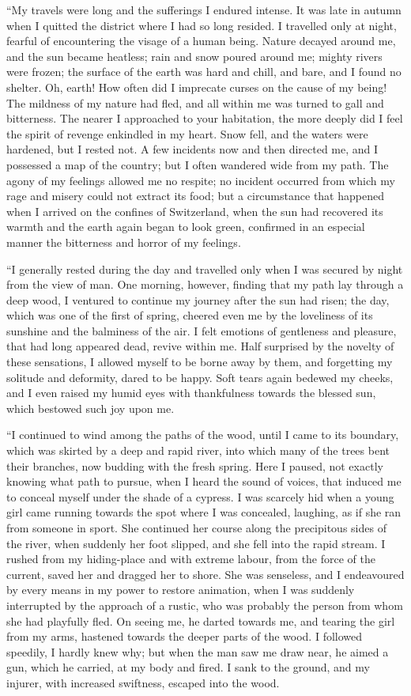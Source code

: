 \documentclass[12pt,openright]{book}
\begin{document}
“My travels were long and the sufferings I endured intense. It was late in autumn when I quitted the district where I had so long resided. I travelled only at night, fearful of encountering the visage of a human being. Nature decayed around me, and the sun became heatless; rain and snow poured around me; mighty rivers were frozen; the surface of the earth was hard and chill, and bare, and I found no shelter. Oh, earth! How often did I imprecate curses on the cause of my being! The mildness of my nature had fled, and all within me was turned to gall and bitterness. The nearer I approached to your habitation, the more deeply did I feel the spirit of revenge enkindled in my heart. Snow fell, and the waters were hardened, but I rested not. A few incidents now and then directed me, and I possessed a map of the country; but I often wandered wide from my path. The agony of my feelings allowed me no respite; no incident occurred from which my rage and misery could not extract its food; but a circumstance that happened when I arrived on the confines of Switzerland, when the sun had recovered its warmth and the earth again began to look green, confirmed in an especial manner the bitterness and horror of my feelings.

“I generally rested during the day and travelled only when I was secured by night from the view of man. One morning, however, finding that my path lay through a deep wood, I ventured to continue my journey after the sun had risen; the day, which was one of the first of spring, cheered even me by the loveliness of its sunshine and the balminess of the air. I felt emotions of gentleness and pleasure, that had long appeared dead, revive within me. Half surprised by the novelty of these sensations, I allowed myself to be borne away by them, and forgetting my solitude and deformity, dared to be happy. Soft tears again bedewed my cheeks, and I even raised my humid eyes with thankfulness towards the blessed sun, which bestowed such joy upon me.

“I continued to wind among the paths of the wood, until I came to its boundary, which was skirted by a deep and rapid river, into which many of the trees bent their branches, now budding with the fresh spring. Here I paused, not exactly knowing what path to pursue, when I heard the sound of voices, that induced me to conceal myself under the shade of a cypress. I was scarcely hid when a young girl came running towards the spot where I was concealed, laughing, as if she ran from someone in sport. She continued her course along the precipitous sides of the river, when suddenly her foot slipped, and she fell into the rapid stream. I rushed from my hiding-place and with extreme labour, from the force of the current, saved her and dragged her to shore. She was senseless, and I endeavoured by every means in my power to restore animation, when I was suddenly interrupted by the approach of a rustic, who was probably the person from whom she had playfully fled. On seeing me, he darted towards me, and tearing the girl from my arms, hastened towards the deeper parts of the wood. I followed speedily, I hardly knew why; but when the man saw me draw near, he aimed a gun, which he carried, at my body and fired. I sank to the ground, and my injurer, with increased swiftness, escaped into the wood.
\end{document}
